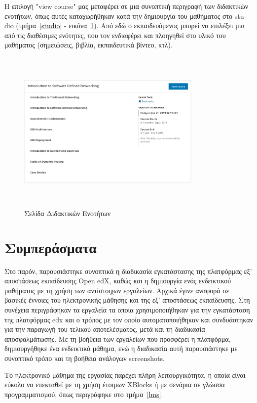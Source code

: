 \documentclass[12pt]{report}
\begin{document}
Η επιλογή \textlatin{"view course"} μας μεταφέρει σε μια συνοπτική περιγραφή των διδακτικών ενοτήτων, όπως αυτές καταχωρήθηκαν κατά την δημιουργία του μαθήματος στο \textlatin{studio} (τμήμα~\ref{studio} - εικόνα~\ref{fig:microsite-course2}). Από εδώ ο εκπαιδευόμενος μπορεί να επιλέξει μια από τις διαθέσιμες ενότητες, που τον ενδιαφέρει και πλοηγηθεί στο υλικό του μαθήματος (σημειώσεις, βιβλία, εκπαιδευτικά βίντεο, κτλ).
\begin{figure}[!htbp]
\centering
\includegraphics[width=0.8\textwidth, height=8cm]{microsite-course2}
\caption{Σελίδα Διδακτικών Ενοτήτων}
\label{fig:microsite-course2}
\end{figure}

\section{Συμπεράσματα}
Στο παρόν, παρουσιάστηκε συνοπτικά η διαδικασία εγκατάστασης της πλατφόρμας εξ' αποστάσεως εκπαίδευσης \textlatin{Open edX}, καθώς και η δημιουργία ενός ενδεικτικού μαθήματος με τη χρήση των αντίστοιχων εργαλείων. Αρχικά έγινε αναφορά σε βασικές έννοιες του ηλεκτρονικής μάθησης και της εξ' αποστάσεως εκπαίδευσης. Στη συνέχεια περιγράφηκαν τα εργαλεία τα οποία χρησιμοποιήθηκαν για την εγκατάσταση της πλατφόρμας \textlatin{edx} και ο τρόπος με τον οποίο αυτοματοποιήθηκαν και συνδυάστηκαν για την παραγωγή του τελικού αποτελέσματος, μετά και τη διαδικασία αποσφαλμάτωσης. Με τη βοήθεια των εργαλείων που προσφέρει η πλατφόρμα, δημιουργήθηκε ένα ενδεικτικό μάθημα, ενώ η διαδικασία αυτή παρουσιάστηκε με συνοπτικό τρόπο και τη βοήθεια ανάλογων \textlatin{screenshots}.

Το ηλεκτρονικό μάθημα της εργασίας παρέχει πλήρη λειτουργικότητα, η οποία είναι εύκολο να επεκταθεί με τη χρήση έτοιμων \textlatin{XBlocks} ή με σενάρια σε γλώσσα προγραμματισμού, όπως περιγράφηκε στο τμήμα~\ref{lms}.
\end{document}
